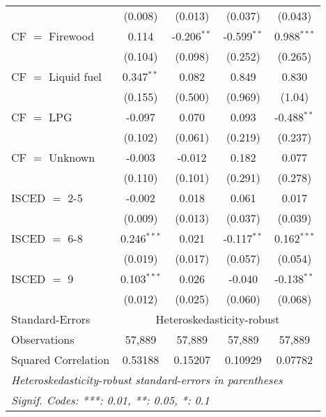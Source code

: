 \begin{table}[htbp!]
\begin{adjustbox}{width = 1\textwidth, max height = 0.95\textheight, center}
\begin{threeparttable}[b]
\begin{tabular}{lcccc}
                                 & (0.008)            & (0.013)            & (0.037)        & (0.043)\\   
            CF $=$ Firewood      & 0.114              & -0.206$^{**}$      & -0.599$^{**}$  & 0.988$^{***}$\\   
                                 & (0.104)            & (0.098)            & (0.252)        & (0.265)\\   
            CF $=$ Liquid fuel   & 0.347$^{**}$       & 0.082              & 0.849          & 0.830\\   
                                 & (0.155)            & (0.500)            & (0.969)        & (1.04)\\   
            CF $=$ LPG           & -0.097             & 0.070              & 0.093          & -0.488$^{**}$\\   
                                 & (0.102)            & (0.061)            & (0.219)        & (0.237)\\   
            CF $=$ Unknown       & -0.003             & -0.012             & 0.182          & 0.077\\   
                                 & (0.110)            & (0.101)            & (0.291)        & (0.278)\\   
            ISCED $=$ 2-5        & -0.002             & 0.018              & 0.061          & 0.017\\   
                                 & (0.009)            & (0.013)            & (0.037)        & (0.039)\\   
            ISCED $=$ 6-8        & 0.246$^{***}$      & 0.021              & -0.117$^{**}$  & 0.162$^{***}$\\   
                                 & (0.019)            & (0.017)            & (0.057)        & (0.054)\\   
            ISCED $=$ 9          & 0.103$^{***}$      & 0.026              & -0.040         & -0.138$^{**}$\\   
                                 & (0.012)            & (0.025)            & (0.060)        & (0.068)\\   
            \midrule 
            Standard-Errors & \multicolumn{4}{c}{Heteroskedasticity-robust} \\ 
            Observations         & 57,889             & 57,889             & 57,889         & 57,889\\  
            Squared Correlation  & 0.53188            & 0.15207            & 0.10929        & 0.07782\\  
            \midrule \midrule
            \multicolumn{5}{l}{\emph{Heteroskedasticity-robust standard-errors in parentheses}}\\
            \multicolumn{5}{l}{\emph{Signif. Codes: ***: 0.01, **: 0.05, *: 0.1}}\\
         \end{tabular}
         

\end{threeparttable}
\end{adjustbox}
\end{table}
